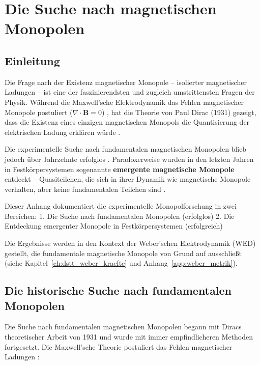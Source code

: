 
\chapter{Die Suche nach magnetischen Monopolen}
\label{app:monopolforschung}

\section{Einleitung}
\label{app:monopolforschung_einleitung}

Die Frage nach der Existenz magnetischer Monopole – isolierter magnetischer Ladungen – ist eine der faszinierendsten und zugleich umstrittensten Fragen der Physik. Während die Maxwell'sche Elektrodynamik das Fehlen magnetischer Monopole postuliert ($\nabla \cdot \mathbf{B} = 0$) \cite{Maxwell1873}, hat die Theorie von Paul Dirac (1931) gezeigt, dass die Existenz eines einzigen magnetischen Monopols die Quantisierung der elektrischen Ladung erklären würde \cite{Dirac1931}.

Die experimentelle Suche nach fundamentalen magnetischen Monopolen blieb jedoch über Jahrzehnte erfolglos \cite{Assis2005}. Paradoxerweise wurden in den letzten Jahren in Festkörpersystemen sogenannte \textbf{emergente magnetische Monopole} entdeckt – Quasiteilchen, die sich in ihrer Dynamik wie magnetische Monopole verhalten, aber keine fundamentalen Teilchen sind \cite{Castelnovo2008, Ladak2010, Mengotti2011}.

Dieser Anhang dokumentiert die experimentelle Monopolforschung in zwei Bereichen:
1. Die Suche nach fundamentalen Monopolen (erfolglos)
2. Die Entdeckung emergenter Monopole in Festkörpersystemen (erfolgreich)

Die Ergebnisse werden in den Kontext der Weber'schen Elektrodynamik (WED) gestellt, die fundamentale magnetische Monopole von Grund auf ausschließt (siehe Kapitel~\ref{ch:dstt_weber_kraefte} und Anhang~\ref{app:weber_metrik}).

\section{Die historische Suche nach fundamentalen Monopolen}
\label{app:monopolforschung_historisch}

Die Suche nach fundamentalen magnetischen Monopolen begann mit Diracs theoretischer Arbeit von 1931 \cite{Dirac1931} und wurde mit immer empfindlicheren Methoden fortgesetzt. Die Maxwell'sche Theorie postuliert das Fehlen magnetischer Ladungen \cite{Maxwell1873}:

